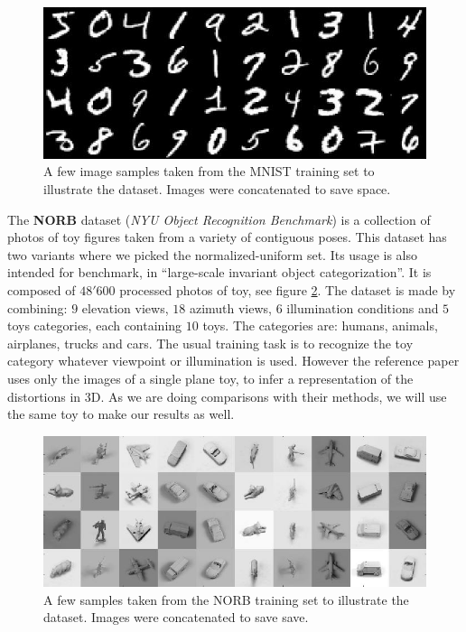 \documentclass[a4paper,12pt]{report}
\begin{document}
\begin{figure}[t]
    \begin{center}
        \includegraphics{thesis_figures/mnist.jpg}
    \end{center}
    \caption{A few image samples taken from the MNIST training set to illustrate the dataset. Images were concatenated to save space.}
    \label{fig:mnist}
\end{figure}

The {\bf NORB} dataset ({\em NYU Object Recognition Benchmark}) is a collection of photos of toy figures taken from a variety of contiguous poses.
This dataset has two variants where we picked the normalized-uniform set.
Its usage is also intended for benchmark, in ``large-scale invariant object categorization''.
It is composed of $48'600$ processed photos of toy, see figure \ref{fig:norb}.
The dataset is made by combining: $9$ elevation views, $18$ azimuth views, $6$ illumination conditions and $5$ toys categories, each containing $10$ toys.
The categories are: humans, animals, airplanes, trucks and cars.
The usual training task is to recognize the toy category whatever viewpoint or illumination is used.
However the reference paper uses only the images of a single plane toy, to infer a representation of the distortions in 3D.
As we are doing comparisons with their methods, we will use the same toy to make our results as well.

\begin{figure}[t]
    \begin{center}
        \includegraphics{thesis_figures/norb.jpg}
    \end{center}
    \caption{A few samples taken from the NORB training set to illustrate the dataset. Images were concatenated to save save.}
    \label{fig:norb}
\end{figure}
\end{document}
